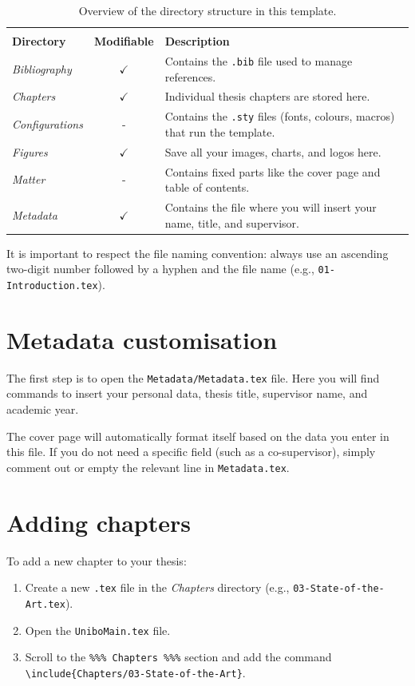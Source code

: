 {	\begin{table}[!htpb]
		\setlength{\extrarowheight}{2pt}
		\caption[Directory structure and file organisation]{Overview of the directory structure in this template.}
		\label{tab:file-structure-en}
		\begin{tabularx}{\textwidth}{lcX}
			\toprule
			\\[-1.5\normalbaselineskip]
			\textbf{Directory} & \textbf{Modifiable} & \textbf{Description} \\ [0em]
			\midrule
			\textit{Bibliography} & $\checkmark$ & Contains the \texttt{.bib} file used to manage references. \\
			\textit{Chapters} & $\checkmark$ & Individual thesis chapters are stored here. \\
			\textit{Configurations} & - & Contains the \texttt{.sty} files (fonts, colours, macros) that run the template. \\
			\textit{Figures} & $\checkmark$ & Save all your images, charts, and logos here. \\
			\textit{Matter} & - & Contains fixed parts like the cover page and table of contents. \\
			\textit{Metadata} & $\checkmark$ & Contains the file where you will insert your name, title, and supervisor. \\
			\bottomrule
		\end{tabularx}
	\end{table}
	
	It is important to respect the file naming convention: always use an ascending two-digit number followed by a hyphen and the file name (e.g., \texttt{01-Introduction.tex}).
	
	\section{Metadata customisation}
	\label{sec:metadata-en}
	The first step is to open the \texttt{Metadata/Metadata.tex} file. Here you will find commands to insert your personal data, thesis title, supervisor name, and academic year.
	
	\begin{block}[note]
		The cover page will automatically format itself based on the data you enter in this file. If you do not need a specific field (such as a co-supervisor), simply comment out or empty the relevant line in \texttt{Metadata.tex}.
	\end{block}
	
	\section{Adding chapters}
	To add a new chapter to your thesis:
	\begin{enumerate}
		\item Create a new \texttt{.tex} file in the \textit{Chapters} directory (e.g., \texttt{03-State-of-the-Art.tex}).
		\item Open the \texttt{UniboMain.tex} file.
		\item Scroll to the \texttt{\%\%\% Chapters \%\%\%} section and add the command \texttt{\textbackslash include\{Chapters/03-State-of-the-Art\}}.
	\end{enumerate}
	
}
